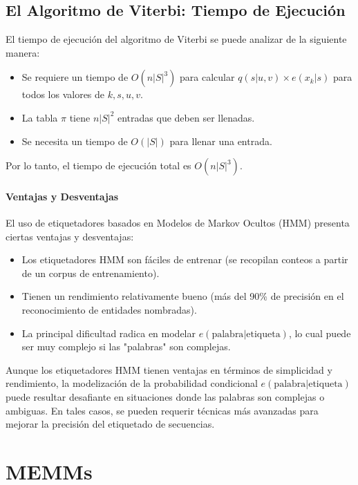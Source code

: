 \subsection{El Algoritmo de Viterbi: Tiempo de Ejecución}
El tiempo de ejecución del algoritmo de Viterbi se puede analizar de la siguiente manera:

\begin{itemize}
    \item Se requiere un tiempo de $O(n|S|^3)$ para calcular $q(s|u, v) \times e(x_k|s)$ para todos los valores de $k, s, u, v$.
    \item La tabla $\pi$ tiene $n|S|^2$ entradas que deben ser llenadas.
    \item Se necesita un tiempo de $O(|S|)$ para llenar una entrada.
\end{itemize}

Por lo tanto, el tiempo de ejecución total es $O(n|S|^3)$.

\paragraph{Ventajas y Desventajas}
El uso de etiquetadores basados en Modelos de Markov Ocultos (HMM) presenta ciertas ventajas y desventajas:

\begin{itemize}
    \item Los etiquetadores HMM son fáciles de entrenar (se recopilan conteos a partir de un corpus de entrenamiento).
    \item Tienen un rendimiento relativamente bueno (más del 90\% de precisión en el reconocimiento de entidades nombradas).
    \item La principal dificultad radica en modelar $e(\text{palabra} | \text{etiqueta})$, lo cual puede ser muy complejo si las "palabras" son complejas.
\end{itemize}

Aunque los etiquetadores HMM tienen ventajas en términos de simplicidad y rendimiento, la modelización de la probabilidad condicional $e(\text{palabra} | \text{etiqueta})$ puede resultar desafiante en situaciones donde las palabras son complejas o ambiguas. En tales casos, se pueden requerir técnicas más avanzadas para mejorar la precisión del etiquetado de secuencias.


\section{MEMMs}  
  
